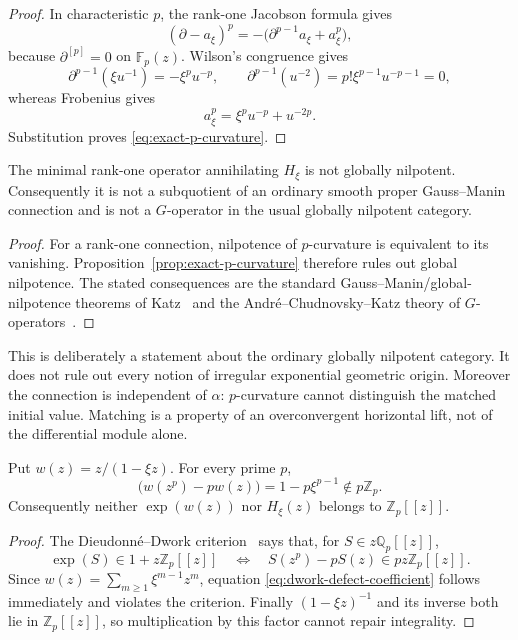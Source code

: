 \begin{proof}
In characteristic $p$, the rank-one Jacobson formula gives
\[
 (\partial-a_\xi)^p
 =-\bigl(\partial^{p-1}a_\xi+a_\xi^p\bigr),
\]
because $\partial^{[p]}=0$ on $\mathbb F_p(z)$.  Wilson's congruence gives
\[
 \partial^{p-1}(\xi u^{-1})=-\xi^pu^{-p},
 \qquad
 \partial^{p-1}(u^{-2})=p!\xi^{p-1}u^{-p-1}=0,
\]
whereas Frobenius gives
\[
 a_\xi^p=\xi^pu^{-p}+u^{-2p}.
\]
Substitution proves \eqref{eq:exact-p-curvature}.
\end{proof}

\begin{corollary}
\label{cor:global-nilpotence-no-go}
The minimal rank-one operator annihilating $H_\xi$ is not globally
nilpotent.  Consequently it is not a subquotient of an ordinary smooth
proper Gauss--Manin connection and is not a $G$-operator in the usual
globally nilpotent category.
\end{corollary}

\begin{proof}
For a rank-one connection, nilpotence of $p$-curvature is equivalent to its
vanishing.  Proposition~\ref{prop:exact-p-curvature} therefore rules out
global nilpotence.  The stated consequences are the standard
Gauss--Manin/global-nilpotence theorems of Katz~\cite{Katz1970} and the
Andr\'e--Chudnovsky--Katz theory of $G$-operators~\cite{Andre1989}.
\end{proof}

\begin{remark}
This is deliberately a statement about the ordinary globally nilpotent
category.  It does not rule out every notion of irregular exponential
geometric origin.  Moreover the connection is independent of $\alpha$:
$p$-curvature cannot distinguish the matched initial value.  Matching is a
property of an overconvergent horizontal lift, not of the differential
module alone.
\end{remark}

\begin{proposition}
\label{prop:dwork-defect}
Put $w(z)=z/(1-\xi z)$.  For every prime $p$,
\begin{equation}
 [z^p]\bigl(w(z^p)-pw(z)\bigr)=1-p\xi^{p-1}\notin p\mathbb Z_p.
\label{eq:dwork-defect-coefficient}
\end{equation}
Consequently neither $\exp(w(z))$ nor $H_\xi(z)$ belongs to
$\mathbb Z_p[[z]]$.
\end{proposition}

\begin{proof}
The Dieudonn\'e--Dwork criterion~\cite{Dieudonne1957} says that, for
$S\in z\mathbb Q_p[[z]]$,
\[
 \exp(S)\in1+z\mathbb Z_p[[z]]
 \quad\Longleftrightarrow\quad
 S(z^p)-pS(z)\in pz\mathbb Z_p[[z]].
\]
Since $w(z)=\sum_{m\geq1}\xi^{m-1}z^m$, equation
\eqref{eq:dwork-defect-coefficient} follows immediately and violates the
criterion.  Finally $(1-\xi z)^{-1}$ and its inverse both lie in
$\mathbb Z_p[[z]]$, so multiplication by this factor cannot repair
integrality.
\end{proof}

